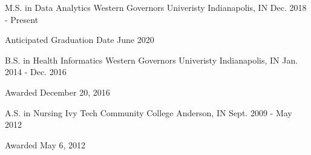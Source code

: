 
\begin{cventries}

  \cventry
    {M.S. in Data Analytics} %
    {Western Governors Univeristy} %
    {Indianapolis, IN} %
    {Dec. 2018 - Present} %
    {
      \begin{cvitems} %
        \item {Anticipated Graduation Date June 2020}
      \end{cvitems}
    }

  \cventry
    {B.S. in Health Informatics} %
    {Western Governors Univeristy} %
    {Indianapolis, IN} %
    {Jan. 2014 - Dec. 2016} %
    {
      \begin{cvitems} %
        \item {Awarded December 20, 2016}
      \end{cvitems}
    }


  \cventry
    {A.S. in Nursing} %
    {Ivy Tech Community College} %
    {Anderson, IN} %
    {Sept. 2009 - May 2012} %
    {
      \begin{cvitems} %
        \item {Awarded May 6, 2012}
      \end{cvitems}
    }

\end{cventries}
\newpage

